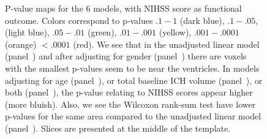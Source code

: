 \documentclass[10pt]{article}\usepackage[]{graphicx}\usepackage[]{color}
\begin{document}
\begin{figure}[H]
{ }
  \hfill
  \hfill
  
  \caption{P-value maps for the $6$ models, with NIHSS score as functional outcome. Colors correspond to p-values $.1-1$ (dark blue), $.1-.05$, (light blue), $.05-.01$ (green), $.01-.001$ (yellow),  $.001-.0001$ (orange) $< .0001$ (red).  We see that in the unadjusted linear model (panel~\protect{}) and after adjusting for gender (panel~\protect{}) there are voxels with the smallest p-values seem to be near the ventricles.  In models adjusting for age (panel~\protect{}), or total baseline ICH volume (panel~\protect{}), or both (panel~\protect{}), the p-value relating to NIHSS scores appear higher (more bluish).  Also, we see the Wilcoxon rank-sum test have lower p-values for the same area compared to the unadjusted linear model (panel~\protect{}). Slices are presented at the middle of the template.  }
  \label{f:mods}
\end{figure}
\end{document}

